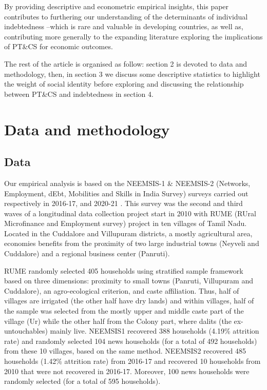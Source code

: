 \documentclass[a4paper, 11pt, onecolumn]{article}
\begin{document}
By providing descriptive and econometric empirical insights, this paper contributes to furthering our understanding of the determinants of individual indebtedness --which is rare and valuable in developing countries, as well as, contributing more generally to the expanding literature exploring the implications of PT\&CS for economic outcomes.

The rest of the article is organised as follow: section 2 is devoted to data and methodology, then, in section 3 we discuss some descriptive statistics to highlight the weight of social identity before exploring and discussing the relationship between PT\&CS and indebtedness in section 4.



\newpage
\section{Data and methodology}


	\subsection{Data}
	\label{subsection:data}

Our empirical analysis is based on the NEEMSIS-1 \& NEEMSIS-2 (Networks, Employment, dEbt, Mobilities and Skills in India Survey) surveys carried out respectively in 2016-17, and 2020-21 \citep{NEEMSISreport, NEEMSIS2017}.
This survey was the second and third waves of a longitudinal data collection project start in 2010 with RUME (RUral Microfinance and Employment survey) project in ten villages of Tamil Nadu.
Located in the Cuddalore and Villupuram districts, a mostly agricultural area, economies benefits from the proximity of two large industrial towns (Neyveli and Cuddalore) and a regional business center (Panruti).

RUME randomly selected 405 households using stratified sample framework based on three dimensions: proximity to small towns (Panruti, Villupuram and Cuddalore), an agro-ecological criterion, and caste affiliation.
Thus, half of villages are irrigated (the other half have dry lands) and within villages, half of the sample was selected from the mostly upper and middle caste part of the village (Ur) while the other half from the Colony part, where dalits (the ex-untouchables)  mainly live. 
NEEMSIS1 recovered 388 households (4.19\% attrition rate) and randomly selected 104 news households (for a total of 492 households) from these 10 villages, based on the same method. 
NEEMSIS2 recovered 485 households (1.42\% attrition rate) from 2016-17 and recovered 10 households from 2010 that were not recovered in 2016-17.
Moreover, 100 news households were randomly selected (for a total of 595 households).
\end{document}
